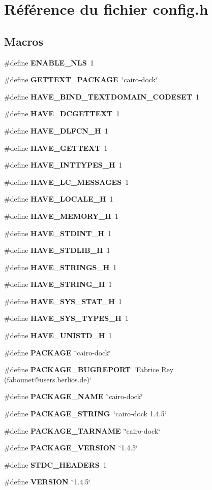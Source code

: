 \section{R\'{e}f\'{e}rence du fichier config.h}
\label{config_8h}
\subsection*{Macros}
\begin{CompactItemize}
\item 
\#define {\bf ENABLE\_\-NLS}~1
\item 
\#define {\bf GETTEXT\_\-PACKAGE}~\char`\"{}cairo-dock\char`\"{}
\item 
\#define {\bf HAVE\_\-BIND\_\-TEXTDOMAIN\_\-CODESET}~1
\item 
\#define {\bf HAVE\_\-DCGETTEXT}~1
\item 
\#define {\bf HAVE\_\-DLFCN\_\-H}~1
\item 
\#define {\bf HAVE\_\-GETTEXT}~1
\item 
\#define {\bf HAVE\_\-INTTYPES\_\-H}~1
\item 
\#define {\bf HAVE\_\-LC\_\-MESSAGES}~1
\item 
\#define {\bf HAVE\_\-LOCALE\_\-H}~1
\item 
\#define {\bf HAVE\_\-MEMORY\_\-H}~1
\item 
\#define {\bf HAVE\_\-STDINT\_\-H}~1
\item 
\#define {\bf HAVE\_\-STDLIB\_\-H}~1
\item 
\#define {\bf HAVE\_\-STRINGS\_\-H}~1
\item 
\#define {\bf HAVE\_\-STRING\_\-H}~1
\item 
\#define {\bf HAVE\_\-SYS\_\-STAT\_\-H}~1
\item 
\#define {\bf HAVE\_\-SYS\_\-TYPES\_\-H}~1
\item 
\#define {\bf HAVE\_\-UNISTD\_\-H}~1
\item 
\#define {\bf PACKAGE}~\char`\"{}cairo-dock\char`\"{}
\item 
\#define {\bf PACKAGE\_\-BUGREPORT}~\char`\"{}Fabrice Rey (fabounet@users.berlios.de)\char`\"{}
\item 
\#define {\bf PACKAGE\_\-NAME}~\char`\"{}cairo-dock\char`\"{}
\item 
\#define {\bf PACKAGE\_\-STRING}~\char`\"{}cairo-dock 1.4.5\char`\"{}
\item 
\#define {\bf PACKAGE\_\-TARNAME}~\char`\"{}cairo-dock\char`\"{}
\item 
\#define {\bf PACKAGE\_\-VERSION}~\char`\"{}1.4.5\char`\"{}
\item 
\#define {\bf STDC\_\-HEADERS}~1
\item 
\#define {\bf VERSION}~\char`\"{}1.4.5\char`\"{}
\end{CompactItemize}


